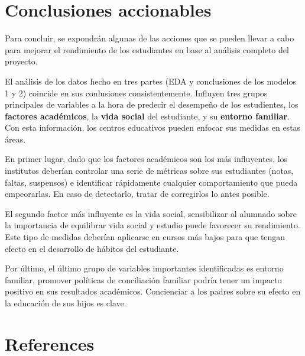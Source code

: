 \documentclass{article}
\begin{document}
\section{Conclusiones accionables}

Para concluir, se expondrán algunas de las acciones que se pueden llevar a cabo para mejorar el rendimiento de los estudiantes en base al análisis completo del proyecto.

El análisis de los datos hecho en tres partes (EDA y conclusiones de los modelos 1 y 2) coincide en sus conlusiones consistentemente. Influyen tres grupos principales de variables a la hora de predecir el desempeño de los estudientes, los \textbf{factores académicos}, la \textbf{vida social} del estudiante, y su \textbf{entorno familiar}.
Con esta información, los centros educativos pueden enfocar sus medidas en estas áreas. 

En primer lugar, dado que los factores académicos son los más influyentes, los institutos deberían controlar una serie de métricas sobre sus estudiantes (notas, faltas, suspensos) e identificar rápidamente cualquier comportamiento que pueda empeorarlas. En caso de detectarlo, tratar de corregirlos lo antes posible.

El segundo factor más influyente es la vida social, sensibilizar al alumnado sobre la importancia de equilibrar vida social y estudio puede favorecer su rendimiento. Este tipo de medidas deberían 
aplicarse en cursos más bajos para que tengan efecto en el desarrollo de hábitos del estudiante.

Por último, el último grupo de variables importantes identificadas es entorno familiar, promover políticas de conciliación familiar podría tener un impacto positivo en sus resultados académicos. Concienciar a los padres sobre su efecto 
en la educación de sus hijos es clave. 

\section*{References}
\end{document}
